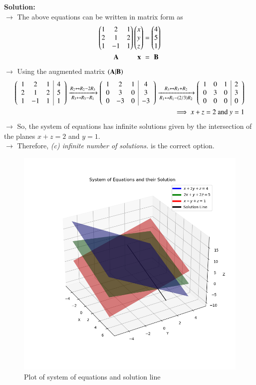 \documentclass[journal]{IEEEtran}
\begin{document}
\textbf{Solution:}\\
$\rightarrow$ The above equations can be written in matrix form as
\begin{align}
    \begin{pmatrix}1&2&1\\2&1&2\\1&-1&1\end{pmatrix}\begin{pmatrix}x\\y\\z\end{pmatrix} &= \begin{pmatrix}4\\5\\1\end{pmatrix} \\
    \mathbf{A} \hspace{0.95cm} \mathbf{x} \hspace{0.12cm} &= \hspace{0.12cm} \mathbf{B}
\end{align}
$\rightarrow$ Using the augmented matrix $\left(\mathbf{A}|\mathbf{B}\right)$
\begin{align}
    \left(\begin{array}{ccc|c}1&2&1&4\\2&1&2&5\\1&-1&1&1\end{array}\right)
    \xrightarrow[R_3 \leftrightarrow R_3 - R_1]{R_2 \leftrightarrow R_2 - 2R_3} \left(\begin{array}{ccc|c}1&2&1&4\\0&3&0&3\\0&-3&0&-3\end{array}\right)
    \xrightarrow[R_1 \leftrightarrow R_1 - (2/3)R_2]{R_3 \leftrightarrow R_3 + R_2}
    \left(\begin{array}{ccc|c}1&0&1&2\\0&3&0&3\\0&0&0&0\end{array}\right) \\
    \implies x + z = 2 \text{ and } y = 1
\end{align}
$\rightarrow$ So, the system of equations has infinite solutions given by the intersection of the planes $x + z = 2$ and $y = 1$. \\
$\rightarrow$ Therefore, \textit{(c) infinite number of solutions.} is the correct option.
\begin{figure}[h!]
   \centering
   \includegraphics[width=0.64\linewidth]{figs/01.png}
   \caption{Plot of system of equations and solution line}
   \label{Plot_1}
\end{figure}
\end{document}

